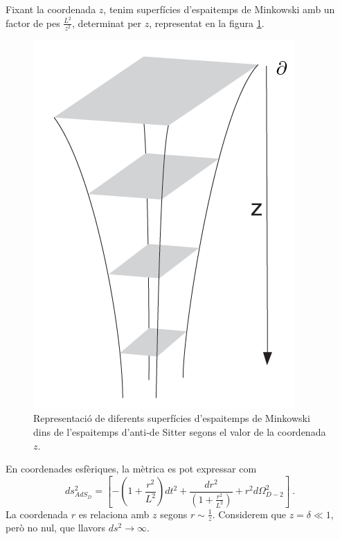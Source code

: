 \documentclass[twocolumn]{article}
\begin{document}
Fixant la coordenada $z$, tenim superfícies d'espaitemps de Minkowski amb un factor de pes $\frac{L^2}{z^2}$, determinat per $z$, representat en la figura \ref{fig:Superficies_z}.
\begin{figure}[h!]
    \centering
    \includegraphics[scale=0.5]{../Imatges/Captura_Superficies_z.png}
\caption{Representació de diferents superfícies d'espaitemps de Minkowski dins de l'espaitemps d'anti-de Sitter segons el valor de la coordenada $z$.}
\label{fig:Superficies_z}
\end{figure}

En coordenades esfèriques, la mètrica es pot expressar com
\begin{equation}
    ds_{AdS_D}^2 = \left [ - \left ( 1 + \frac{r^2}{L^2} \right ) dt^2 + \frac{dr^2}{\left ( 1+ \frac{r^2}{L^2} \right )} + r^2 d \Omega_{D-2}^2 \right ] \ .
\label{eq:MetEsfAdS}
\end{equation}
La coordenada $r$ es relaciona amb $z$ segons $r \sim \frac{1}{z}$. Considerem que $z = \delta \ll 1$, però no nul, que llavors $ds^2 \to \infty$.






\end{document}
